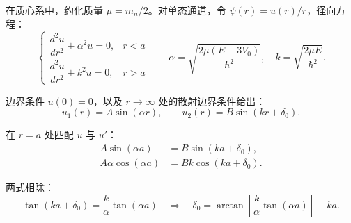 \begin{derivationbox}[s 波分波法求解]
在质心系中，约化质量 $\mu = m_n/2$。对单态通道，令 $\psi(r) = u(r)/r$，径向方程：
\[
\begin{cases}
\dfrac{d^2 u}{dr^2} + \alpha^2 u = 0, & r < a \\[6pt]
\dfrac{d^2 u}{dr^2} + k^2 u = 0, & r > a
\end{cases}
\qquad
\alpha = \sqrt{\frac{2\mu(E + 3V_0)}{\hbar^2}}, \quad k = \sqrt{\frac{2\mu E}{\hbar^2}}.
\]

边界条件 $u(0) = 0$，以及 $r \to \infty$ 处的散射边界条件给出：
\[
u_1(r) = A\sin(\alpha r), \qquad u_2(r) = B\sin(kr + \delta_0).
\]

在 $r = a$ 处匹配 $u$ 与 $u'$：
\begin{align*}
A\sin(\alpha a) &= B\sin(ka + \delta_0), \\
A\alpha\cos(\alpha a) &= Bk\cos(ka + \delta_0).
\end{align*}

两式相除：
\[
\tan(ka + \delta_0) = \frac{k}{\alpha}\tan(\alpha a) \quad \Longrightarrow \quad \delta_0 = \arctan\!\left[ \frac{k}{\alpha}\tan(\alpha a) \right] - ka.
\]
\end{derivationbox}


